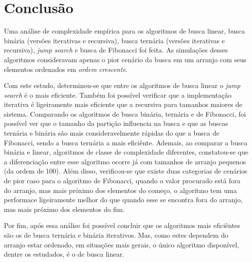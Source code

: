 \chapter{Conclusão}

Uma análise de complexidade empírica para os algoritmos de busca linear, busca binária (versões iterativas e recursiva), busca ternária (versões iterativas e recursiva), {\it jump search} e busca de Fibonacci foi feita. As simulações desses algoritmos consideravam apenas o pior cenário da busca em um arranjo com seus elementos ordenados em {\it ordem crescente}.

Com este estudo, determinou-se que entre os algoritmos de busca linear o {\it jump search} é o mais eficiente. Também foi possível verificar que a implementação iterativa é ligeiramente mais eficiente que a recursiva para tamanhos maiores de sistema. Comparando os algoritmos de busca binária, ternária e de Fibonacci, foi possível ver que o tamanho da partição influencia na busca e que as buscas ternária e binária são mais consideravelmente rápidas do que a busca de Fibonacci, sendo a busca ternária a mais eficiênte. Ademais, ao comparar a busca binária e linear, algoritmos de classe de complexidade diferentes, constatou-se que a diferenciação entre esse algoritmo ocorre já com tamanhos de arranjo pequenos (da ordem de 100). Além disso, verificou-se que existe duas categorias de cenários de pior caso para o algoritmo de Fibonacci, quando o valor procurado está fora do arranjo, mas mais próximo dos elementos do começo, o algoritmo tem uma performace ligeiramente melhor do que quando esse se encontra fora do arranjo, mas mais próximo dos elementos do fim.

Por fim, após essa análise foi possível concluir que os algoritmos mais eficiêntes são os de busca ternária e binária iterativos. Mas, como estes dependem do arranjo estar ordenado, em situações mais gerais, o único algoritmo disponível, dentre os estudados, é o de busca linear.
